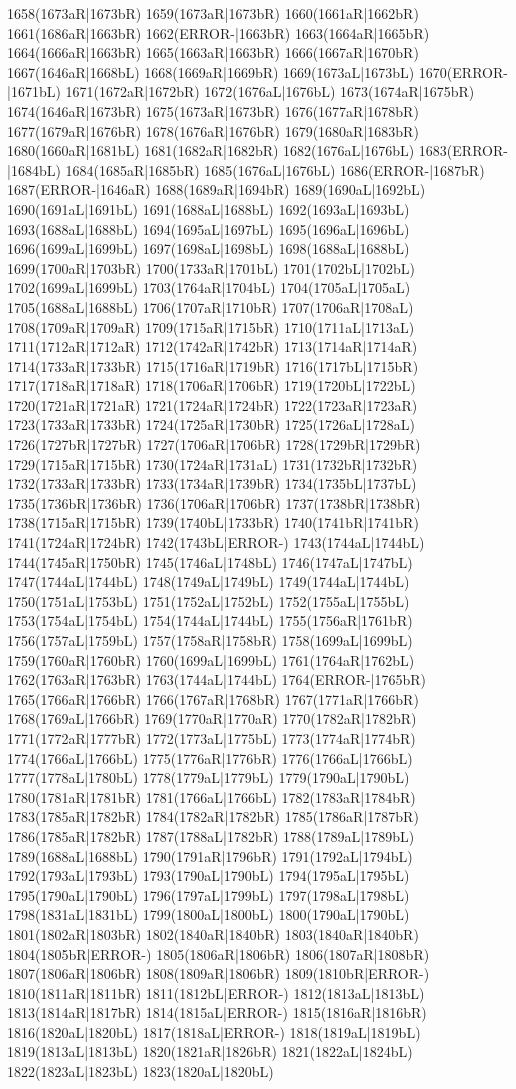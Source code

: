 1658(1673aR|1673bR) 1659(1673aR|1673bR) 1660(1661aR|1662bR) 1661(1686aR|1663bR) 1662(ERROR-|1663bR) 1663(1664aR|1665bR) 1664(1666aR|1663bR) 1665(1663aR|1663bR) 1666(1667aR|1670bR) 1667(1646aR|1668bL) 1668(1669aR|1669bR) 1669(1673aL|1673bL) 1670(ERROR-|1671bL) 1671(1672aR|1672bR) 1672(1676aL|1676bL) 1673(1674aR|1675bR) 1674(1646aR|1673bR) 1675(1673aR|1673bR) 1676(1677aR|1678bR) 1677(1679aR|1676bR) 1678(1676aR|1676bR) 1679(1680aR|1683bR) 1680(1660aR|1681bL) 1681(1682aR|1682bR) 1682(1676aL|1676bL) 1683(ERROR-|1684bL) 1684(1685aR|1685bR) 1685(1676aL|1676bL) 1686(ERROR-|1687bR) 1687(ERROR-|1646aR) 1688(1689aR|1694bR) 1689(1690aL|1692bL) 1690(1691aL|1691bL) 1691(1688aL|1688bL) 1692(1693aL|1693bL) 1693(1688aL|1688bL) 1694(1695aL|1697bL) 1695(1696aL|1696bL) 1696(1699aL|1699bL) 1697(1698aL|1698bL) 1698(1688aL|1688bL) 1699(1700aR|1703bR) 1700(1733aR|1701bL) 1701(1702bL|1702bL) 1702(1699aL|1699bL) 1703(1764aR|1704bL) 1704(1705aL|1705aL) 1705(1688aL|1688bL) 1706(1707aR|1710bR) 1707(1706aR|1708aL) 1708(1709aR|1709aR) 1709(1715aR|1715bR) 1710(1711aL|1713aL) 1711(1712aR|1712aR) 1712(1742aR|1742bR) 1713(1714aR|1714aR) 1714(1733aR|1733bR) 1715(1716aR|1719bR) 1716(1717bL|1715bR) 1717(1718aR|1718aR) 1718(1706aR|1706bR) 1719(1720bL|1722bL) 1720(1721aR|1721aR) 1721(1724aR|1724bR) 1722(1723aR|1723aR) 1723(1733aR|1733bR) 1724(1725aR|1730bR) 1725(1726aL|1728aL) 1726(1727bR|1727bR) 1727(1706aR|1706bR) 1728(1729bR|1729bR) 1729(1715aR|1715bR) 1730(1724aR|1731aL) 1731(1732bR|1732bR) 1732(1733aR|1733bR) 1733(1734aR|1739bR) 1734(1735bL|1737bL) 1735(1736bR|1736bR) 1736(1706aR|1706bR) 1737(1738bR|1738bR) 1738(1715aR|1715bR) 1739(1740bL|1733bR) 1740(1741bR|1741bR) 1741(1724aR|1724bR) 1742(1743bL|ERROR-) 1743(1744aL|1744bL) 1744(1745aR|1750bR) 1745(1746aL|1748bL) 1746(1747aL|1747bL) 1747(1744aL|1744bL) 1748(1749aL|1749bL) 1749(1744aL|1744bL) 1750(1751aL|1753bL) 1751(1752aL|1752bL) 1752(1755aL|1755bL) 1753(1754aL|1754bL) 1754(1744aL|1744bL) 1755(1756aR|1761bR) 1756(1757aL|1759bL) 1757(1758aR|1758bR) 1758(1699aL|1699bL) 1759(1760aR|1760bR) 1760(1699aL|1699bL) 1761(1764aR|1762bL) 1762(1763aR|1763bR) 1763(1744aL|1744bL) 1764(ERROR-|1765bR) 1765(1766aR|1766bR) 1766(1767aR|1768bR) 1767(1771aR|1766bR) 1768(1769aL|1766bR) 1769(1770aR|1770aR) 1770(1782aR|1782bR) 1771(1772aR|1777bR) 1772(1773aL|1775bL) 1773(1774aR|1774bR) 1774(1766aL|1766bL) 1775(1776aR|1776bR) 1776(1766aL|1766bL) 1777(1778aL|1780bL) 1778(1779aL|1779bL) 1779(1790aL|1790bL) 1780(1781aR|1781bR) 1781(1766aL|1766bL) 1782(1783aR|1784bR) 1783(1785aR|1782bR) 1784(1782aR|1782bR) 1785(1786aR|1787bR) 1786(1785aR|1782bR) 1787(1788aL|1782bR) 1788(1789aL|1789bL) 1789(1688aL|1688bL) 1790(1791aR|1796bR) 1791(1792aL|1794bL) 1792(1793aL|1793bL) 1793(1790aL|1790bL) 1794(1795aL|1795bL) 1795(1790aL|1790bL) 1796(1797aL|1799bL) 1797(1798aL|1798bL) 1798(1831aL|1831bL) 1799(1800aL|1800bL) 1800(1790aL|1790bL) 1801(1802aR|1803bR) 1802(1840aR|1840bR) 1803(1840aR|1840bR) 1804(1805bR|ERROR-) 1805(1806aR|1806bR) 1806(1807aR|1808bR) 1807(1806aR|1806bR) 1808(1809aR|1806bR) 1809(1810bR|ERROR-) 1810(1811aR|1811bR) 1811(1812bL|ERROR-) 1812(1813aL|1813bL) 1813(1814aR|1817bR) 1814(1815aL|ERROR-) 1815(1816aR|1816bR) 1816(1820aL|1820bL) 1817(1818aL|ERROR-) 1818(1819aL|1819bL) 1819(1813aL|1813bL) 1820(1821aR|1826bR) 1821(1822aL|1824bL) 1822(1823aL|1823bL) 1823(1820aL|1820bL) 